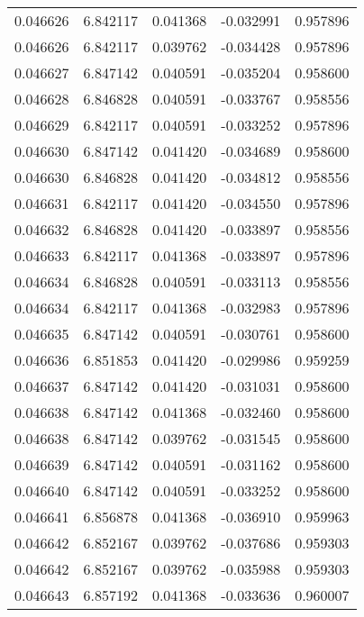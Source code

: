 \begin{tabular}{lrrrr}
0.046626    &  6.842117 &  0.041368 & -0.032991 &             0.957896 \\
0.046626    &  6.842117 &  0.039762 & -0.034428 &             0.957896 \\
0.046627    &  6.847142 &  0.040591 & -0.035204 &             0.958600 \\
0.046628    &  6.846828 &  0.040591 & -0.033767 &             0.958556 \\
0.046629    &  6.842117 &  0.040591 & -0.033252 &             0.957896 \\
0.046630    &  6.847142 &  0.041420 & -0.034689 &             0.958600 \\
0.046630    &  6.846828 &  0.041420 & -0.034812 &             0.958556 \\
0.046631    &  6.842117 &  0.041420 & -0.034550 &             0.957896 \\
0.046632    &  6.846828 &  0.041420 & -0.033897 &             0.958556 \\
0.046633    &  6.842117 &  0.041368 & -0.033897 &             0.957896 \\
0.046634    &  6.846828 &  0.040591 & -0.033113 &             0.958556 \\
0.046634    &  6.842117 &  0.041368 & -0.032983 &             0.957896 \\
0.046635    &  6.847142 &  0.040591 & -0.030761 &             0.958600 \\
0.046636    &  6.851853 &  0.041420 & -0.029986 &             0.959259 \\
0.046637    &  6.847142 &  0.041420 & -0.031031 &             0.958600 \\
0.046638    &  6.847142 &  0.041368 & -0.032460 &             0.958600 \\
0.046638    &  6.847142 &  0.039762 & -0.031545 &             0.958600 \\
0.046639    &  6.847142 &  0.040591 & -0.031162 &             0.958600 \\
0.046640    &  6.847142 &  0.040591 & -0.033252 &             0.958600 \\
0.046641    &  6.856878 &  0.041368 & -0.036910 &             0.959963 \\
0.046642    &  6.852167 &  0.039762 & -0.037686 &             0.959303 \\
0.046642    &  6.852167 &  0.039762 & -0.035988 &             0.959303 \\
0.046643    &  6.857192 &  0.041368 & -0.033636 &             0.960007 \\

\end{tabular}
